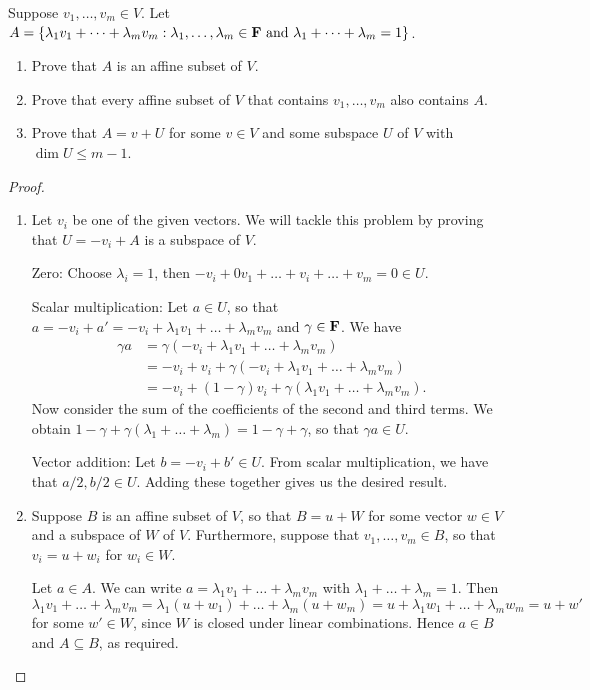 \begin{exercise}{11}
  Suppose $v_1,\dots,v_m\in V$. Let\\ $A=\{\lambda_1v_1+\dots+\lambda_mv_m:\lambda_1,\dots,\lambda_m \in \mathbf{F}\text{ and }\lambda_1+\dots+\lambda_m=1\}$.
  \begin{enumerate}
      \item Prove that $A$ is an affine subset of $V$.
      \item Prove that every affine subset of $V$ that contains $v_1,\dots,v_m$ also contains $A$.
      \item Prove that $A=v+U$ for some $v\in V$ and some subspace $U$ of $V$ with $\dim U\leq m-1$.
  \end{enumerate}
\end{exercise}
\begin{proof}
 \begin{enumerate}
     \item Let $v_i$ be one of the given vectors. We will tackle this problem by proving that $U=-v_i+A$ is a subspace of $V$.

     Zero: Choose $\lambda_i=1$, then $-v_i+0v_1+\dots+v_i+\dots+v_m=0\in U$.

     Scalar multiplication: Let $a\in U$, so that $a=-v_i+a'=-v_i+\lambda_1v_1+\dots+\lambda_mv_m$ and $\gamma\in\mathbf{F}$. We have 
     \begin{align*}
         \gamma a &= \gamma(-v_i+\lambda_1v_1+\dots+\lambda_mv_m)\\
         &= -v_i+v_i+\gamma(-v_i+\lambda_1v_1+\dots+\lambda_mv_m)\\
         &= -v_i+(1-\gamma)v_i+\gamma(\lambda_1v_1+\dots+\lambda_mv_m).
     \end{align*}
     Now consider the sum of the coefficients of the second and third terms. We obtain $1-\gamma+\gamma(\lambda_1+\dots+\lambda_m)=1-\gamma+\gamma$, so that $\gamma a\in U$.
     
     Vector addition: Let $b=-v_i+b'\in U$. From scalar multiplication, we have that $a/2,b/2\in U$. Adding these together gives us the desired result.
     \item Suppose $B$ is an affine subset of $V$, so that $B=u+W$ for some vector $w\in V$ and a subspace of $W$ of $V$. Furthermore, suppose that $v_1,\dots,v_m\in B$, so that $v_i=u+w_i$ for $w_i\in W$.

    Let $a\in A$. We can write $a=\lambda_1v_1+\dots+\lambda_mv_m$ with $\lambda_1+\dots+\lambda_m=1$. Then $\lambda_1v_1+\dots+\lambda_mv_m= \lambda_1(u+w_1)+\dots+\lambda_m(u+w_m)= u+\lambda_1w_1+\dots+\lambda_mw_m= u+w'$ for some $w'\in W$, since $W$ is closed under linear combinations. Hence $a\in B$ and $A\subseteq B$, as required.
     

\end{enumerate}
\end{proof}
